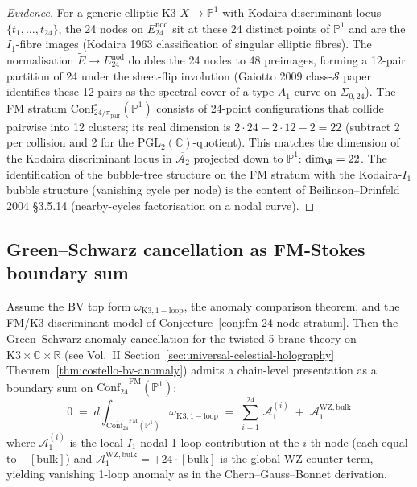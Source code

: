 \begin{proof}[Evidence]
For a generic elliptic K3 $X\to\mathbb{P}^1$ with Kodaira
discriminant locus $\{t_1,\ldots,t_{24}\}$, the 24 nodes on
$E^{\mathrm{nod}}_{24}$ sit at these 24 distinct points of
$\mathbb{P}^1$ and are the $I_1$-fibre images (Kodaira 1963
classification of singular elliptic fibres). The normalisation
$\widetilde E \to E^{\mathrm{nod}}_{24}$ doubles the 24 nodes to
48 preimages, forming a 12-pair partition of 24 under the
sheet-flip involution (Gaiotto 2009 class-$\mathcal S$
paper identifies these 12 pairs as the spectral cover of a
type-$A_1$ curve on $\Sigma_{0,24}$).
The FM stratum $\mathrm{Conf}^{\circ}_{24/\pi_{\mathrm{pair}}}(\mathbb{P}^1)$
consists of 24-point configurations that collide pairwise into
12 clusters; its real dimension is $2\cdot 24 - 2\cdot 12 - 2 =
22$ (subtract 2 per collision and 2 for the
$\mathrm{PGL}_2(\mathbb{C})$-quotient). This matches the
dimension of the Kodaira discriminant locus in
$\overline{\mathcal A_2}$ projected down to $\mathbb{P}^1$:
$\dim_\R = 22$. The identification of the bubble-tree structure
on the FM stratum with the Kodaira-$I_1$ bubble structure
(vanishing cycle per node) is the content of
Beilinson--Drinfeld 2004 \S 3.5.14 (nearby-cycles factorisation
on a nodal curve).
\end{proof}

\subsection{Green--Schwarz cancellation as FM-Stokes boundary sum}
\label{subsec:fm-greenschwarz}

\begin{proposition}[FM-Stokes presentation of
$\chi(\mathrm{K3}) = 24$ anomaly from the K3 discriminant hypotheses]
\label{prop:fm-stokes-chiK3}
Assume the BV top form $\omega_{\mathrm{K3,1-loop}}$, the anomaly
comparison theorem, and the FM/K3 discriminant model of
Conjecture~\ref{conj:fm-24-node-stratum}. Then the Green--Schwarz
anomaly cancellation for the twisted 5-brane
theory on $\mathrm{K3}\times\mathbb{C}\times\mathbb{R}$
(see Vol.~II Section~\ref{sec:universal-celestial-holography}
Theorem~\ref{thm:costello-bv-anomaly}) admits a chain-level
presentation as a boundary sum on
$\overline{\mathrm{Conf}_{24}}^{\mathrm{FM}}(\mathbb{P}^1)$:
\begin{equation}
\label{eq:fm-stokes-chi24-anomaly}
0
\;=\;
d\!\!\int_{\overline{\mathrm{Conf}_{24}}^{\mathrm{FM}}(\mathbb{P}^1)}\!
\omega_{\mathrm{K3,1-loop}}
\;=\;
\sum_{i=1}^{24}\,\mathcal A_1^{(i)} \;+\; \mathcal A_1^{\mathrm{WZ,bulk}}
\end{equation}
where $\mathcal A_1^{(i)}$ is the local $I_1$-nodal 1-loop
contribution at the $i$-th node (each equal to $-[\mathrm{bulk}]$)
and $\mathcal A_1^{\mathrm{WZ,bulk}} = +24\cdot[\mathrm{bulk}]$
is the global WZ counter-term, yielding vanishing 1-loop
anomaly as in the Chern--Gauss--Bonnet derivation.
\end{proposition}

